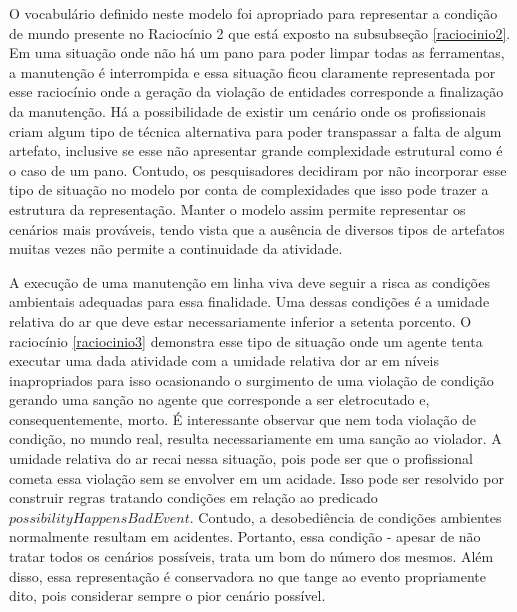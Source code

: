 O vocabulário definido neste modelo foi apropriado para representar a condição de mundo presente no Raciocínio 2 que está exposto na subsubseção \ref{raciocinio2}. 
Em uma situação onde não há um pano para poder limpar todas as ferramentas, a manutenção é interrompida e essa situação ficou claramente representada por 
esse raciocínio onde a geração da violação de entidades corresponde a finalização da manutenção. Há a possibilidade de existir um cenário onde os 
profissionais criam algum tipo de técnica alternativa para poder transpassar a falta de algum artefato, inclusive se esse não apresentar grande complexidade 
estrutural como é o caso de um pano. Contudo, os pesquisadores decidiram por não incorporar esse tipo de situação no modelo por conta de complexidades que 
isso pode trazer a estrutura da representação. Manter o modelo assim permite representar os cenários mais prováveis, tendo vista que a ausência de diversos 
tipos de artefatos muitas vezes não permite a continuidade da atividade.    

A execução de uma manutenção em linha viva deve seguir a risca as condições ambientais adequadas para essa finalidade. Uma dessas condições é a umidade 
relativa do ar que deve estar necessariamente inferior a setenta porcento. O raciocínio \ref{raciocinio3} demonstra esse tipo de situação onde um agente 
tenta executar uma dada atividade com a umidade relativa dor ar em níveis inapropriados para isso ocasionando o surgimento de uma violação de condição 
gerando uma sanção no agente que corresponde a ser eletrocutado e, consequentemente, morto. É interessante observar que nem toda violação de condição, 
no mundo real, resulta necessariamente em uma sanção ao violador. A umidade relativa do ar recai nessa situação, pois pode ser que o profissional cometa
essa violação sem se envolver em um acidade. Isso pode ser resolvido por construir regras tratando condições em relação ao predicado $possibilityHappensBadEvent$.
Contudo, a desobediência de condições ambientes normalmente resultam em acidentes. Portanto, essa condição - apesar de não tratar todos os cenários possíveis, 
trata um bom do número dos mesmos. Além disso, essa representação é conservadora no que tange ao evento propriamente dito, pois considerar sempre o pior 
cenário possível.

